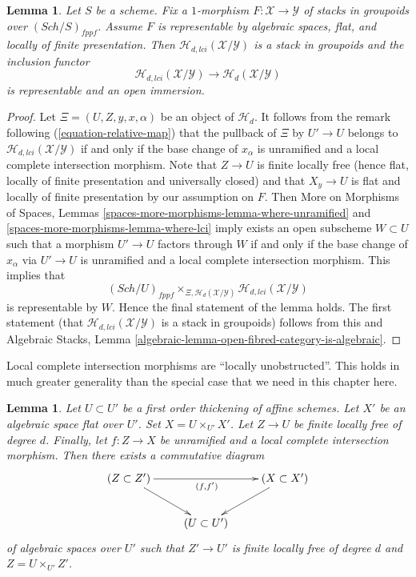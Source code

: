 \documentclass{stacks-project}
\theoremstyle{plain}
\newtheorem{lemma}[subsection]{Lemma}
\theoremstyle{definition}
\theoremstyle{remark}
\numberwithin{equation}{subsection}
\def\Sch{\mathit{Sch}}
\begin{document}
\begin{lemma}
\label{lemma-lci-locus-stack-in-groupoids}
Let $S$ be a scheme. Fix a $1$-morphism
$F : \mathcal{X} \longrightarrow \mathcal{Y}$
of stacks in groupoids over $(\Sch/S)_{fppf}$.
Assume $F$ is representable by algebraic spaces, flat, and locally
of finite presentation. Then $\mathcal{H}_{d, lci}(\mathcal{X}/\mathcal{Y})$
is a stack in groupoids and the inclusion functor
$$
\mathcal{H}_{d, lci}(\mathcal{X}/\mathcal{Y})
\longrightarrow
\mathcal{H}_d(\mathcal{X}/\mathcal{Y})
$$
is representable and an open immersion.
\end{lemma}

\begin{proof}
Let $\Xi = (U, Z, y, x, \alpha)$ be an object of $\mathcal{H}_d$. It follows
from the remark following
(\ref{equation-relative-map})
that the pullback of $\Xi$ by $U' \to U$ belongs to
$\mathcal{H}_{d, lci}(\mathcal{X}/\mathcal{Y})$ if and only if the base
change of $x_\alpha$ is unramified and a local complete intersection morphism.
Note that $Z \to U$ is finite locally free (hence flat, locally of
finite presentation and universally closed) and that $X_y \to U$ is
flat and locally of finite presentation by our assumption on $F$. Then
More on Morphisms of Spaces, Lemmas
\ref{spaces-more-morphisms-lemma-where-unramified} and
\ref{spaces-more-morphisms-lemma-where-lci}
imply exists an open subscheme $W \subset U$ such that a morphism
$U' \to U$ factors through $W$ if and only if the base change of
$x_\alpha$ via $U' \to U$ is unramified and a local complete intersection
morphism. This implies that
$$
(\Sch/U)_{fppf}
\times_{\Xi, \mathcal{H}_d(\mathcal{X}/\mathcal{Y})}
\mathcal{H}_{d, lci}(\mathcal{X}/\mathcal{Y})
$$
is representable by $W$. Hence the final statement of the lemma
holds. The first statement (that
$\mathcal{H}_{d, lci}(\mathcal{X}/\mathcal{Y})$ is a stack in groupoids)
follows from this and
Algebraic Stacks,
Lemma \ref{algebraic-lemma-open-fibred-category-is-algebraic}.
\end{proof}

\noindent
Local complete intersection morphisms are ``locally unobstructed''.
This holds in much greater generality than the special case
that we need in this chapter here.

\begin{lemma}
\label{lemma-lci-unobstructed}
Let $U \subset U'$ be a first order thickening of affine schemes.
Let $X'$ be an algebraic space flat over $U'$. Set $X = U \times_{U'} X'$.
Let $Z \to U$ be finite locally free of degree $d$. Finally, let
$f : Z \to X$ be unramified and a local complete intersection morphism.
Then there exists a commutative diagram
$$
\xymatrix{
(Z \subset Z') \ar[rd] \ar[rr]_{(f, f')} & & (X \subset X') \ar[ld] \\
& (U \subset U')
}
$$
of algebraic spaces over $U'$ such that $Z' \to U'$ is finite locally free
of degree $d$ and $Z = U \times_{U'} Z'$.
\end{lemma}
\end{document}
